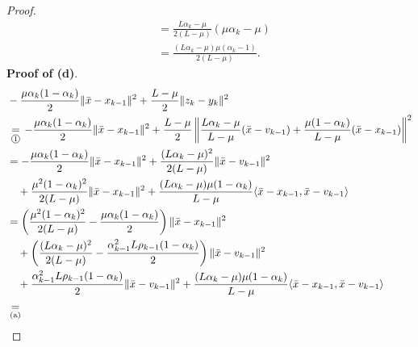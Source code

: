 \documentclass[12pt]{article}
\begin{document}
\begin{proof}
{\begin{align*}
                &= \frac{L\alpha_k - \mu}{2(L - \mu)}\left(
                    \mu\alpha_k - \mu
                \right)
                \\
                &= \frac{(L\alpha_k - \mu)\mu(\alpha_k - 1)}{2(L - \mu)}. 
            \end{align*}
            }
            \textbf{Proof of (d)}. 
            {\allowdisplaybreaks
            \begin{align*}
                &- \frac{\mu\alpha_k(1 - \alpha_k)}{2}\Vert \bar x - x_{k - 1}\Vert^2
                + \frac{L - \mu}{2}\Vert z_k - y_k\Vert^2
                \\
                &\underset{\text{\circled{1}}}{=} 
                -\frac{\mu\alpha_k(1 - \alpha_k)}{2}\Vert \bar x - x_{k - 1}\Vert^2
                + \frac{L - \mu}{2}
                \left\Vert 
                    \frac{L\alpha_k - \mu}{L - \mu}(\bar x - v_{k - 1}) + 
                    \frac{\mu(1 - \alpha_k)}{L - \mu}(\bar x - x_{k - 1})
                \right\Vert^2
                \\
                &= 
                - \frac{\mu\alpha_k(1 - \alpha_k)}{2}\Vert \bar x - x_{k - 1}\Vert^2
                + \frac{(L\alpha_k - \mu)^2}{2(L - \mu)} \Vert \bar x - v_{k - 1}\Vert^2
                \\
                &\quad
                    + \frac{\mu^2(1 - \alpha_k)^2}{2(L - \mu)} \Vert \bar x - x_{k - 1}\Vert^2
                    + \frac{(L\alpha_k - \mu)\mu(1 - \alpha_k)}{L - \mu}\langle \bar x - x_{k - 1}, \bar x - v_{k - 1}\rangle
                \\
                &= \left(
                    \frac{\mu^2(1 - \alpha_k)^2}{2(L - \mu)} - \frac{\mu\alpha_k(1 - \alpha_k)}{2}
                \right)\Vert \bar x - x_{k - 1}\Vert^2
                    \\ &\quad 
                    + 
                    \left(
                        \frac{(L\alpha_k - \mu)^2}{2(L - \mu)}
                        - \frac{\alpha_{k - 1}^2L \rho_{k - 1}(1 - \alpha_k)}{2}
                    \right)\Vert \bar x - v_{k - 1}\Vert^2
                    \\ &\quad 
                    + \frac{\alpha_{k - 1}^2L \rho_{k - 1}(1 - \alpha_k)}{2}\Vert \bar x - v_{k - 1}\Vert^2
                    + \frac{(L\alpha_k - \mu)\mu(1 - \alpha_k)}{L - \mu}\langle \bar x - x_{k - 1}, \bar x - v_{k - 1}\rangle
                \\
                &\underset{\text{(a)}}{=} 

\end{align*}}
\end{proof}
\end{document}
